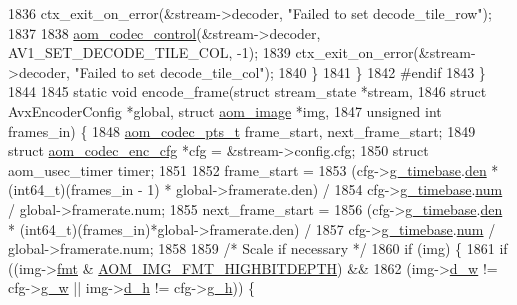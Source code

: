\begin{DoxyCodeInclude}
{{{{{{{{{{{{{{{{{{{{{{{{{{{{{{{{1836       ctx\_exit\_on\_error(&stream->decoder, \textcolor{stringliteral}{"Failed to set decode\_tile\_row"});
1837 
1838       \hyperlink{group__codec_ga6da974f4eeaba1fa74106b28d0fe6ac5}{aom\_codec\_control}(&stream->decoder, AV1\_SET\_DECODE\_TILE\_COL, -1);
1839       ctx\_exit\_on\_error(&stream->decoder, \textcolor{stringliteral}{"Failed to set decode\_tile\_col"});
1840     \}
1841   \}
1842 \textcolor{preprocessor}{#endif}
1843 \}
1844 
1845 \textcolor{keyword}{static} \textcolor{keywordtype}{void} encode\_frame(\textcolor{keyword}{struct} stream\_state *stream,
1846                          \textcolor{keyword}{struct} AvxEncoderConfig *global, \textcolor{keyword}{struct} \hyperlink{structaom__image}{aom\_image} *img,
1847                          \textcolor{keywordtype}{unsigned} \textcolor{keywordtype}{int} frames\_in) \{
1848   \hyperlink{group__encoder_ga958524226c9a65251c9e4f7bb78fc606}{aom\_codec\_pts\_t} frame\_start, next\_frame\_start;
1849   \textcolor{keyword}{struct }\hyperlink{structaom__codec__enc__cfg}{aom\_codec\_enc\_cfg} *cfg = &stream->config.cfg;
1850   \textcolor{keyword}{struct }aom\_usec\_timer timer;
1851 
1852   frame\_start =
1853       (cfg->\hyperlink{structaom__codec__enc__cfg_a10664f1fc5b6ec29b77ee13efeeecdf7}{g\_timebase}.\hyperlink{structaom__rational_adeddf2ea01c12b7be66536e0a0fb92c5}{den} * (int64\_t)(frames\_in - 1) * global->framerate.den) /
1854       cfg->\hyperlink{structaom__codec__enc__cfg_a10664f1fc5b6ec29b77ee13efeeecdf7}{g\_timebase}.\hyperlink{structaom__rational_a7b48174411798c780a15f132c4650839}{num} / global->framerate.num;
1855   next\_frame\_start =
1856       (cfg->\hyperlink{structaom__codec__enc__cfg_a10664f1fc5b6ec29b77ee13efeeecdf7}{g\_timebase}.\hyperlink{structaom__rational_adeddf2ea01c12b7be66536e0a0fb92c5}{den} * (int64\_t)(frames\_in)*global->framerate.den) /
1857       cfg->\hyperlink{structaom__codec__enc__cfg_a10664f1fc5b6ec29b77ee13efeeecdf7}{g\_timebase}.\hyperlink{structaom__rational_a7b48174411798c780a15f132c4650839}{num} / global->framerate.num;
1858 
1859   \textcolor{comment}{/* Scale if necessary */}
1860   \textcolor{keywordflow}{if} (img) \{
1861     \textcolor{keywordflow}{if} ((img->\hyperlink{structaom__image_a6c64b1ab918d80d52eb8f5d6d957e825}{fmt} & \hyperlink{aom__image_8h_a607b37d91f75442f54223ecd85f1b6cb}{AOM\_IMG\_FMT\_HIGHBITDEPTH}) &&
1862         (img->\hyperlink{structaom__image_a89f80b1f58d608b9d2080635f4359034}{d\_w} != cfg->\hyperlink{structaom__codec__enc__cfg_a80cb459c5ef3c7e1516f617c4c9d6eab}{g\_w} || img->\hyperlink{structaom__image_ab986419a1f0fff93a2dc505f47194988}{d\_h} != cfg->\hyperlink{structaom__codec__enc__cfg_a37b0f57b63bec8d133df8901d4407ee6}{g\_h})) \{
}}}}}}}}}}}}}}}}}}}}}}}}}}}}}}}}
\end{DoxyCodeInclude}
